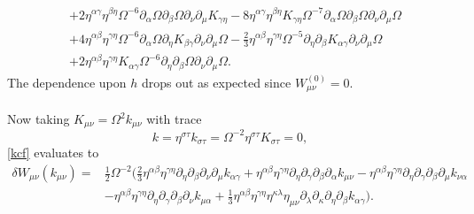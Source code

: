 \documentclass[10pt,letterpaper]{article}
\begin{document}
\begin{align}
& + 2 \eta^{\alpha \gamma} \eta^{\beta \eta} \Omega^{-6} \partial_{\alpha}\Omega \partial_{\beta}\Omega \partial_{\nu}\partial_{\mu}K_{\gamma \eta}
 - 8 \eta^{\alpha \gamma} \eta^{\beta \eta} K_{\gamma \eta} \Omega^{-7} \partial_{\alpha}\Omega \partial_{\beta}\Omega \partial_{\nu}\partial_{\mu}\Omega\nonumber\\
& + 4 \eta^{\alpha \beta} \eta^{\gamma \eta} \Omega^{-6} \partial_{\alpha}\Omega \partial_{\eta}K_{\beta \gamma} \partial_{\nu}\partial_{\mu}\Omega
 -  \tfrac{2}{3} \eta^{\alpha \beta} \eta^{\gamma \eta} \Omega^{-5} \partial_{\eta}\partial_{\beta}K_{\alpha \gamma} \partial_{\nu}\partial_{\mu}\Omega\nonumber\\
& + 2 \eta^{\alpha \beta} \eta^{\gamma \eta} K_{\alpha \gamma} \Omega^{-6} \partial_{\eta}\partial_{\beta}\Omega \partial_{\nu}\partial_{\mu}\Omega.\label{kcf}
\end{align}
The dependence upon $h$ drops out as expected since $W_{\mu\nu}^{(0)} = 0$. 
\\ \\
Now taking $K_{\mu\nu} = \Omega^{2}k_{\mu\nu}$ with trace
\begin{equation}
k = \eta^{\sigma\tau}k_{\sigma\tau} = \Omega^{-2}\eta^{\sigma\tau} K_{\sigma\tau} = 0,
\end{equation}
\eqref{kcf} evaluates to
\begin{align}
\delta W_{\mu\nu}(k_{\mu\nu}) ={}&\frac12 \Omega^{-2}\bigg(\frac{2}{3} \eta^{\alpha \beta} \eta^{\gamma \eta}  \partial_{\eta}\partial_{\beta}\partial_{\nu}\partial_{\mu}k_{\alpha \gamma}
 + \eta^{\alpha \beta} \eta^{\gamma \eta}  \partial_{\eta}\partial_{\gamma}\partial_{\beta}\partial_{\alpha}k_{\mu \nu}
 -  \eta^{\alpha \beta} \eta^{\gamma \eta}  \partial_{\eta}\partial_{\gamma}\partial_{\beta}\partial_{\mu}k_{\nu \alpha}\nonumber\\
& -  \eta^{\alpha \beta} \eta^{\gamma \eta}  \partial_{\eta}\partial_{\gamma}\partial_{\beta}\partial_{\nu}k_{\mu \alpha}
 + \frac{1}{3} \eta^{\alpha \beta} \eta^{\gamma \eta} \eta^{\kappa \lambda} \eta_{\mu \nu} \partial_{\lambda}\partial_{\kappa}\partial_{\eta}\partial_{\beta}k_{\alpha \gamma}\bigg).
\end{align}
\end{document}
